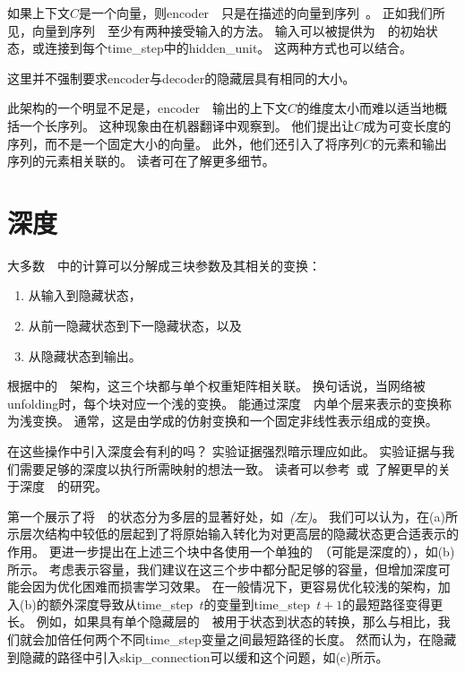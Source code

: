 如果上下文$C$是一个向量，则\gls{encoder}~~只是在描述的向量到序列~。
正如我们所见，向量到序列~~至少有两种接受输入的方法。
输入可以被提供为~~的初始状态，或连接到每个\gls{time_step}中的\gls{hidden_unit}。
这两种方式也可以结合。

这里并不强制要求\gls{encoder}与\gls{decoder}的隐藏层具有相同的大小。

此架构的一个明显不足是，\gls{encoder}~~输出的上下文$C$的维度太小而难以适当地概括一个长序列。
这种现象由\cite{Bahdanau-et-al-ICLR2015-small}在机器翻译中观察到。
他们提出让$C$成为可变长度的序列，而不是一个固定大小的向量。
此外，他们还引入了将序列$C$的元素和输出序列的元素相关联的。
读者可在了解更多细节。


\section{深度}
\label{sec:deep_recurrent_networks}
大多数~~中的计算可以分解成三块参数及其相关的变换：
\begin{enumerate}
 \item 从输入到隐藏状态，
 \item 从前一隐藏状态到下一隐藏状态，以及
 \item 从隐藏状态到输出。
\end{enumerate}
根据中的~~架构，这三个块都与单个权重矩阵相关联。
换句话说，当网络被\gls{unfolding}时，每个块对应一个浅的变换。
能通过深度~~内单个层来表示的变换称为浅变换。
通常，这是由学成的仿射变换和一个固定非线性表示组成的变换。

在这些操作中引入深度会有利的吗？
实验证据\citep{Graves-arxiv2013,Pascanu-et-al-ICLR2014}强烈暗示理应如此。
实验证据与我们需要足够的深度以执行所需映射的想法一致。
读者可以参考~\cite{Schmidhuber96,ElHihi+Bengio-nips8}或~\cite{Jaeger2007}了解更早的关于深度~~的研究。

\cite{Graves-arxiv2013}第一个展示了将~~的状态分为多层的显著好处，如~\emph{(左)}。
我们可以认为，在(a)所示层次结构中较低的层起到了将原始输入转化为对更高层的隐藏状态更合适表示的作用。
\cite{Pascanu-et-al-ICLR2014}更进一步提出在上述三个块中各使用一个单独的~（可能是深度的），如(b)所示。
考虑表示容量，我们建议在这三个步中都分配足够的容量，但增加深度可能会因为优化困难而损害学习效果。
在一般情况下，更容易优化较浅的架构，加入(b)的额外深度导致从\gls{time_step}~$t$的变量到\gls{time_step}~$t+1$的最短路径变得更长。
例如，如果具有单个隐藏层的~~被用于状态到状态的转换，那么与相比，我们就会加倍任何两个不同\gls{time_step}变量之间最短路径的长度。
然而\cite{Pascanu-et-al-ICLR2014}认为，在隐藏到隐藏的路径中引入\gls{skip_connection}可以缓和这个问题，如(c)所示。

